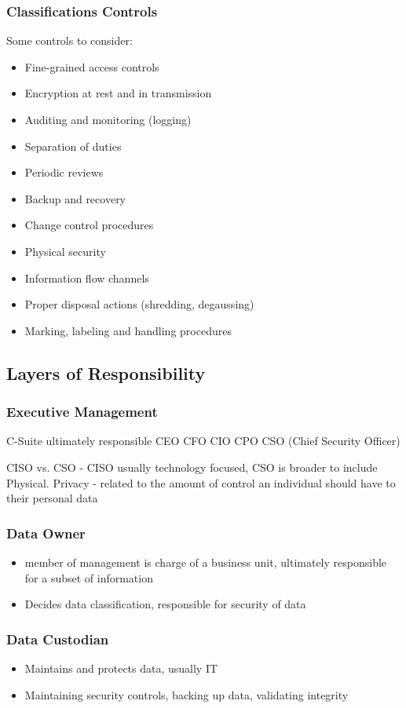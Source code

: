 \documentclass[11pt]{article}
\begin{document}
\subsubsection{Classifications Controls}
\label{sec:org8f5df54}
Some controls to consider:
\begin{itemize}
\item Fine-grained access controls
\item Encryption at rest and in transmission
\item Auditing and monitoring (logging)
\item Separation of duties
\item Periodic reviews
\item Backup and recovery
\item Change control procedures
\item Physical security
\item Information flow channels
\item Proper disposal actions (shredding, degaussing)
\item Marking, labeling and handling procedures
\end{itemize}
\subsection{Layers of Responsibility}
\label{sec:org1858d83}
\subsubsection{Executive Management}
\label{sec:org63dc7df}
C-Suite
ultimately responsible 
CEO
CFO
CIO
CPO
CSO (Chief Security Officer) 

CISO vs. CSO - CISO usually technology focused, CSO is broader to include Physical. 
Privacy - related to the amount of control an individual should have to their personal data
\subsubsection{Data Owner}
\label{sec:org95308bb}
\begin{itemize}
\item member of management is charge of a business unit, ultimately responsible for a subset of information
\item Decides data classification, responsible for security of data
\end{itemize}
\subsubsection{Data Custodian}
\label{sec:org63ba59b}
\begin{itemize}
\item Maintains and protects data, usually IT
\item Maintaining security controls, backing up data, validating integrity
\end{itemize}
\end{document}
